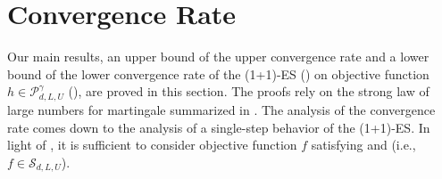 \documentclass[journal]{IEEEtran}
\renewcommand{\geq}{\geqslant} %
\renewcommand{\leq}{\leqslant} %
\DeclarePairedDelimiter{\norm}{\lVert}{\rVert}
\theoremstyle{definition}
\newcommand{\yohe}[1]{{\color{cyan}Y.A.: #1}}
\newcommand{\aup}{\alpha_{\uparrow}}
\newcommand{\adown}{\alpha_{\downarrow}}
\begin{document}




\section{Convergence Rate}

Our main results, an upper bound of the upper convergence rate and a lower bound of the lower convergence rate of the (1+1)-ES () on objective function $h \in \mathcal{P}_{d, L, U}^{\gamma}$ (), are proved in this section. 
The proofs rely on the strong law of large numbers for martingale summarized in .
The analysis of the convergence rate comes down to the analysis of a single-step behavior of the (1+1)-ES.
In light of , it is sufficient to consider objective function $f$ satisfying  and  (i.e., $f \in \mathcal{S}_{d, L, U}$).
\end{document}
